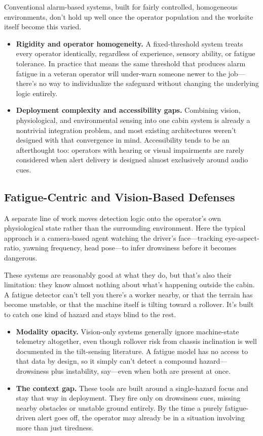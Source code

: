 Conventional alarm-based systems, built for fairly controlled, homogeneous environments, don't hold up well once the operator population and the worksite itself become this varied.
\begin{itemize}
    \item \textbf{Rigidity and operator homogeneity.} A fixed-threshold system treats every operator identically, regardless of experience, sensory ability, or fatigue tolerance. In practice that means the same threshold that produces alarm fatigue in a veteran operator will under-warn someone newer to the job---there's no way to individualize the safeguard without changing the underlying logic entirely.
    \item \textbf{Deployment complexity and accessibility gaps.} Combining vision, physiological, and environmental sensing into one cabin system is already a nontrivial integration problem, and most existing architectures weren't designed with that convergence in mind. Accessibility tends to be an afterthought too: operators with hearing or visual impairments are rarely considered when alert delivery is designed almost exclusively around audio cues.
\end{itemize}

\subsection{Fatigue-Centric and Vision-Based Defenses}
A separate line of work moves detection logic onto the operator's own physiological state rather than the surrounding environment. Here the typical approach is a camera-based agent watching the driver's face---tracking eye-aspect-ratio, yawning frequency, head pose---to infer drowsiness before it becomes dangerous.

These systems are reasonably good at what they do, but that's also their limitation: they know almost nothing about what's happening outside the cabin. A fatigue detector can't tell you there's a worker nearby, or that the terrain has become unstable, or that the machine itself is tilting toward a rollover. It's built to catch one kind of hazard and stays blind to the rest.
\begin{itemize}
    \item \textbf{Modality opacity.} Vision-only systems generally ignore machine-state telemetry altogether, even though rollover risk from chassis inclination is well documented in the tilt-sensing literature. A fatigue model has no access to that data by design, so it simply can't detect a compound hazard---drowsiness plus instability, say---even when both are present at once.
    \item \textbf{The context gap.} These tools are built around a single-hazard focus and stay that way in deployment. They fire only on drowsiness cues, missing nearby obstacles or unstable ground entirely. By the time a purely fatigue-driven alert goes off, the operator may already be in a situation involving more than just tiredness.
\end{itemize}

